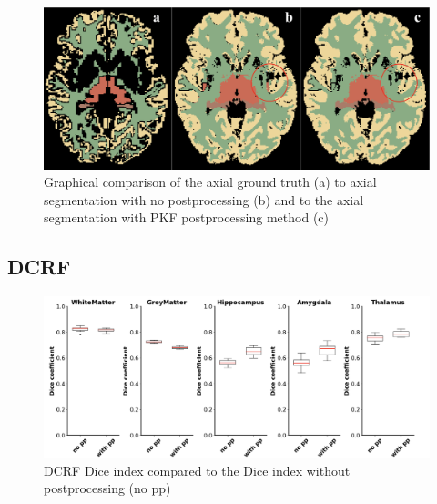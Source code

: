 \documentclass[journal]{IEEEtran}
\begin{document}
\begin{figure}[h!]
\centering

\includegraphics[width=4.9in]{img/boxplots/PKF.png}
\caption{Graphical comparison of the axial ground truth (a) to axial segmentation with no postprocessing (b) and to the axial segmentation with PKF postprocessing method (c) }
\label{fig_pkf_appendix}
\end{figure}
\newpage
\subsection{DCRF}
\label{sec_bb_dcrf}
\begin{figure}[h!]
\centering
\includegraphics[width=4.9in]{img/boxplots/DCRF-DICE.png}
\caption{DCRF Dice index compared to the Dice index without postprocessing (no pp)}
\label{fig_dcrf_dice_appendix}
\end{figure}
\end{document}
